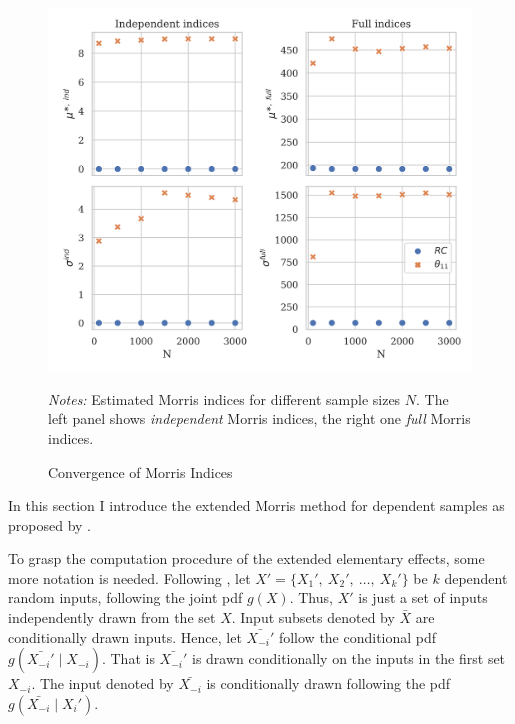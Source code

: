 \begin{figure}[t]
	\caption{Convergence of Morris Indices}
    \label{morris_convergence}
    \begin{centering}
	\vspace*{-4mm}
	\begin{centering}
	\includegraphics[scale=0.9]{../figures/morris_convergence.png}
    \end{centering}
    \end{centering}

    \small
    \textit{Notes:} Estimated Morris indices for different sample sizes $N$. The left panel shows \textit{independent} Morris indices, the right one \textit{full} Morris indices.
\end{figure}

In this section I introduce the extended Morris method for dependent samples as proposed by \citet{GM17}.

To grasp the computation procedure of the extended elementary effects, some more notation is needed. Following \citet{GM17}, let $X' = \{X_1',\ X_2',\ \dots,\ X_k'\}$ be $k$ dependent random inputs, following the joint pdf $g(X)$. Thus, $X'$ is just a set of inputs independently drawn from the set $X$. Input subsets denoted by $\bar{X}$ are conditionally drawn inputs. Hence, let $\bar{X_{-i}'}$ follow the conditional pdf $g(\bar{X_{-i}'} \mid X_{-i})$. That is $\bar{X_{-i}'}$ is drawn conditionally on the inputs in the first set $X_{-i}$. The input denoted by $\bar{X_{-i}}$ is conditionally drawn following the pdf $g(\bar{X_{-i}} \mid X_i')$. %

